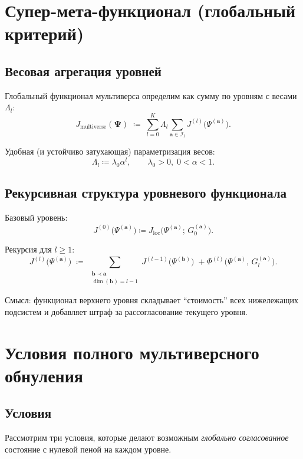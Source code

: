 \documentclass[11pt]{article}
\begin{document}
\section{Супер-мета-функционал (глобальный критерий)}

\subsection{Весовая агрегация уровней}

Глобальный функционал мультиверса определим как сумму по уровням с весами $\Lambda_l$:
\[
J_{\text{multiverse}}(\mathbf{\Psi})
\;\coloneqq\;
\sum_{l=0}^{K}\Lambda_l\sum_{\mathbf{a}\in\mathcal{I}_l} J^{(l)}\bigl(\Psi^{(\mathbf{a})}\bigr).
\]

Удобная (и устойчиво затухающая) параметризация весов:
\[
\Lambda_l\coloneqq \lambda_0\alpha^l,\qquad \lambda_0>0,\; 0<\alpha<1.
\]

\subsection{Рекурсивная структура уровневого функционала}

Базовый уровень:
\[
J^{(0)}\bigl(\Psi^{(\mathbf{a})}\bigr) \coloneqq J_{\text{loc}}\bigl(\Psi^{(\mathbf{a})};\,G_0^{(\mathbf{a})}\bigr).
\]

Рекурсия для $l\ge 1$:
\[
J^{(l)}\bigl(\Psi^{(\mathbf{a})}\bigr)
\;\coloneqq\;
\sum_{\substack{\mathbf{b}\prec\mathbf{a}\\ \dim(\mathbf{b})=l-1}}
J^{(l-1)}\bigl(\Psi^{(\mathbf{b})}\bigr)
\;+
\Phi^{(l)}\bigl(\Psi^{(\mathbf{a})},\,G_l^{(\mathbf{a})}\bigr).
\]

Смысл: функционал верхнего уровня складывает ``стоимость'' всех нижележащих подсистем и добавляет штраф за рассогласование текущего уровня.

\section{Условия полного мультиверсного обнуления}

\subsection{Условия}

Рассмотрим три условия, которые делают возможным \emph{глобально согласованное} состояние с нулевой пеной на каждом уровне.
\end{document}
